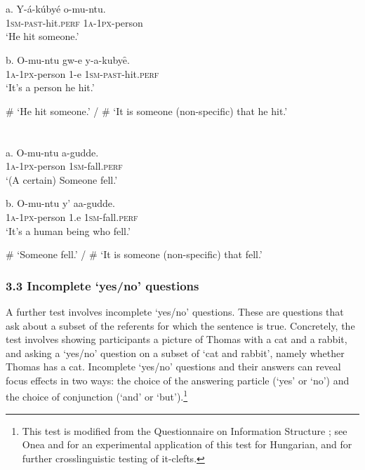 \documentclass[output=paper]{langsci/langscibook}
\begin{document}
\chapter{}
\gll   a.  Y-á-kúbyé    o-mu-ntu.\\
         \textsc{1sm-past}{}-hit.\textsc{perf}  \textsc{1a-1px}{}-person\\
\glt     ‘He hit someone.’
\z

\gll   b.  O-mu-ntu    gw-e  y-a-kubyȇ.\\
         \textsc{1a-1px}{}-person  1-e  \textsc{1sm-past}{}-hit.\textsc{perf}\\
\glt     ‘It’s a person he hit.’
\z

\glt     \# ‘He hit someone.’ / \# ‘It is someone (non-specific) that he hit.’
\z

\chapter[  ]{  }
\gll   a.  O-mu-ntu    a-gudde.\\
         \textsc{1a-1px}{}-person  1\textsc{sm}{}-fall.\textsc{perf}\\
\glt     ‘(A certain) Someone fell.’
\z

\gll   b.  O-mu-ntu    y’  aa-gudde.\\
         \textsc{1a-1px}{}-person  1.e  \textsc{1sm}{}-fall.\textsc{perf}\\
\glt     ‘It’s a human being who fell.’
\z

\glt     \# ‘Someone fell.’ / \# ‘It is someone (non-specific) that fell.’
\z

\subsection{ 3.3 Incomplete ‘yes/no’ questions}

A further test involves incomplete ‘yes/no’ questions. These are questions that ask about a subset of the referents for which the sentence is true. Concretely, the test involves showing participants a picture of Thomas with a cat and a rabbit, and asking a ‘yes/no’ question on a subset of ‘cat and rabbit’, namely whether Thomas has a cat. Incomplete ‘yes/no’ questions and their answers can reveal focus effects in two ways: the choice of the answering particle (‘yes’ or ‘no’) and the choice of conjunction (‘and’ or ‘but’).\footnote{ This test is modified from the Questionnaire on Information Structure \citep{SkopeteasEtAl2006}; see Onea and \citet{Beaver2011} for an experimental application of this test for Hungarian, and \citet{DestruelEtAl2014} for further crosslinguistic testing of it-clefts.}
\end{document}

